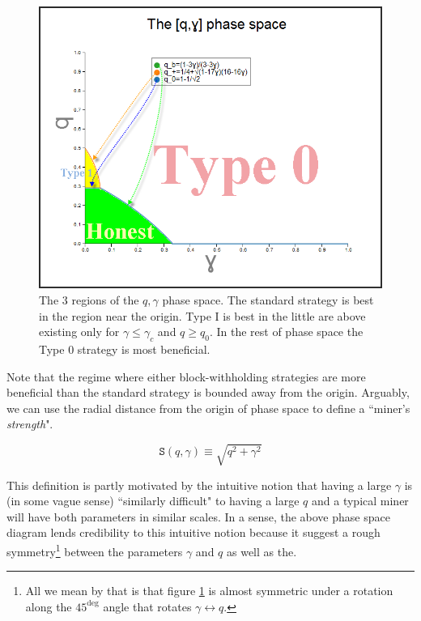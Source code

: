 \documentclass[letterpaper,12pt]{report}
\theoremstyle{plain}
\theoremstyle{definition}
\begin{document}
\begin{figure}[qgammaphasespace]
\centering
\includegraphics[width=130mm]{simpleqgammaphasespace.png}
\caption{The 3 regions of the $q,\gamma$ phase space. The standard strategy is best in the region near the origin. Type I is best in the little are above existing only for $\gamma\leq\gamma_c$ and $q\geq q_0$. In the rest of phase space the Type 0 strategy is most beneficial.}
\label{fig:qgammaphasespace}
\end{figure}


\newpage

Note that the regime where either block-withholding strategies are more beneficial than the standard strategy is bounded away from the origin. Arguably, we can use the radial distance from the origin of phase space to define a ``miner's \textit{strength}".

\begin{equation}\label{defstrength}
\mathtt{S}(q,\gamma)\equiv \sqrt{q^2+\gamma^2}
\end{equation}

This definition is partly motivated by the intuitive notion that having a large $\gamma$ is (in some vague sense) ``similarly difficult" to having a large $q$ and a typical miner will have both parameters in similar scales. In a sense, the above phase space diagram lends credibility to this intuitive notion because it suggest a rough symmetry\footnote{All we mean by that is that figure \ref{fig:qgammaphasespace} is almost symmetric under a rotation along the $45^\deg$ angle that rotates $\gamma \leftrightarrow q$.} between the parameters $\gamma$ and $q$ as well as the.
\end{document}
